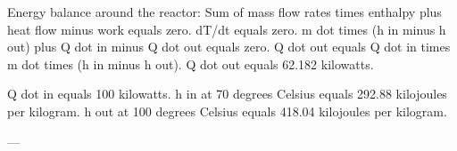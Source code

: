 Energy balance around the reactor:  
Sum of mass flow rates times enthalpy plus heat flow minus work equals zero.  
dT/dt equals zero.  
m dot times (h in minus h out) plus Q dot in minus Q dot out equals zero.  
Q dot out equals Q dot in times m dot times (h in minus h out).  
Q dot out equals 62.182 kilowatts.  

Q dot in equals 100 kilowatts.  
h in at 70 degrees Celsius equals 292.88 kilojoules per kilogram.  
h out at 100 degrees Celsius equals 418.04 kilojoules per kilogram.  

---